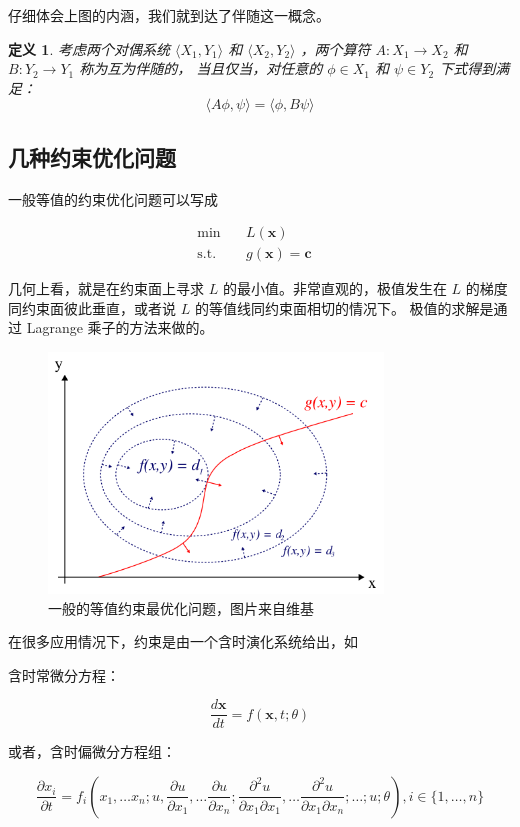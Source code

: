 \documentclass[a4paper,12pt]{article}
\newtheorem{definition}{定义}
\begin{document}
仔细体会上图的内涵，我们就到达了伴随这一概念。

\begin{definition}
\label{d1}
考虑两个对偶系统 $ \langle X_1, Y_1 \rangle $ 和 $ \langle X_2, Y_2 \rangle $ ，两个算符 $ A : X_1 \to X_2$ 和  $B : Y_2 \to Y_1 $ 称为互为伴随的，
当且仅当，对任意的 $ \phi \in X_1 $ 和 $ \psi \in Y_2 $ 下式得到满足：$$ \langle A \phi, \psi \rangle = \langle \phi, B \psi \rangle $$
\end{definition}

\subsection{几种约束优化问题}

一般等值的约束优化问题可以写成

$$
\begin{array}{rcll}
\min &~& L(\mathbf{x}) & \\
\mathrm{s.t.} &~& g(\mathbf{x}) = \mathbf{c}
\end{array}
$$

几何上看，就是在约束面上寻求 $ L $ 的最小值。非常直观的，极值发生在 $ L $ 的梯度同约束面彼此垂直，或者说 $ L $ 的等值线同约束面相切的情况下。
极值的求解是通过 Lagrange 乘子的方法来做的。

\begin{figure}[ht]
\centering
\includegraphics[width=3.5in]{images/adjoint/lagrange_multiplier.png}
\caption{一般的等值约束最优化问题，图片来自维基}
\end{figure}

在很多应用情况下，约束是由一个含时演化系统给出，如

含时常微分方程：

$$
\frac{d\mathbf{x}}{dt} = f(\mathbf{x}, t; \theta)
$$

或者，含时偏微分方程组：

$$
\frac{\partial x_i}{\partial t} = f_i \left( x_1, \ldots x_n; u, \frac{\partial u}{\partial x_1}, \ldots \frac{\partial u}{\partial x_n}; \frac{\partial^2 u}{\partial x_1 \partial x_1}, \ldots \frac{\partial^2 u}{\partial x_1 \partial x_n}; \ldots ; u; \theta \right), i \in \{1, \ldots , n\}
$$
\end{document}
